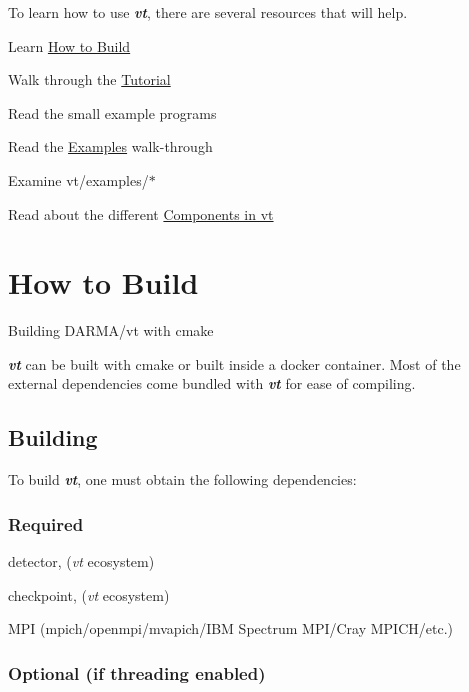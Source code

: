 To learn how to use {\bfseries {\itshape vt}}, there are several resources that will help.


\begin{DoxyItemize}
\item Learn \hyperlink{vt-build}{How to Build}
\item Walk through the \hyperlink{tutorial}{Tutorial}
\item Read the small example programs
\begin{DoxyItemize}
\item Read the \hyperlink{examples}{Examples} walk-\/through
\item Examine {\ttfamily vt/examples/$\ast$}
\end{DoxyItemize}
\item Read about the different \hyperlink{introduction_vt-components}{Components in vt} 
\end{DoxyItemize}\hypertarget{vt-build}{}\section{How to Build}\label{vt-build}
Building D\+A\+R\+M\+A/vt with cmake

{\bfseries {\itshape vt}} can be built with {\ttfamily cmake} or built inside a {\ttfamily docker} container. Most of the external dependencies come bundled with {\bfseries {\itshape vt}} for ease of compiling.\hypertarget{vt-build_how-to-build}{}\subsection{Building}\label{vt-build_how-to-build}
To build {\bfseries {\itshape vt}}, one must obtain the following dependencies\+:\hypertarget{vt-build_required-deps}{}\subsubsection{Required}\label{vt-build_required-deps}

\begin{DoxyItemize}
\item detector, ({\itshape vt} ecosystem)
\item checkpoint, ({\itshape vt} ecosystem)
\item M\+PI (mpich/openmpi/mvapich/\+I\+BM Spectrum M\+P\+I/\+Cray M\+P\+I\+C\+H/etc.)
\end{DoxyItemize}\hypertarget{vt-build_optional-deps}{}\subsubsection{Optional (if threading enabled)}\label{vt-build_optional-deps}

